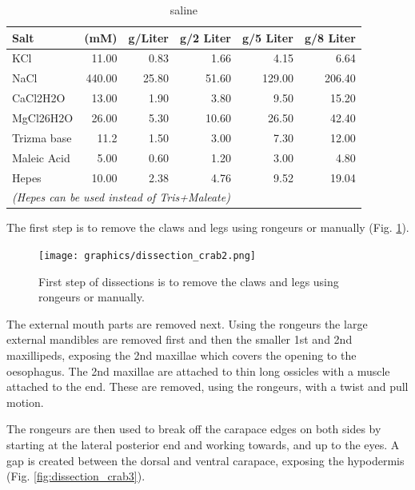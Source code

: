 \begin{table}[H]
	\centering
	\caption{ saline}
	\label{tab:saline}
	\begin{tabular}{lrrrrr}
		\hline 
		\textbf{Salt} & \textbf{(mM)} & \textbf{g/Liter} & \textbf{g/2 Liter} & \textbf{g/5 Liter} & \textbf{g/8 Liter} \\ \hline
		KCl   & 11.00    & 0.83  & 1.66  & 4.15  & 6.64 \\
		NaCl  & 440.00   & 25.80  & 51.60  & 129.00   & 206.40 \\
		CaCl2H2O & 13.00    & 1.90   & 3.80   & 9.50   & 15.20 \\
		MgCl26H2O & 26.00    & 5.30   & 10.60  & 26.50  & 42.40 \\
		Trizma base & 11.2  &  1.50  &  3.00  &  7.30  &  12.00 \\
		Maleic Acid &  5.00  &  0.60  &  1.20  &  3.00  &  4.80 \\
		Hepes &  10.00 &  2.38 &  4.76 &  9.52 & 19.04 \\
		\multicolumn{6}{l}{\textit{(Hepes can be used instead of Tris+Maleate)}} \\
		\hline
	\end{tabular}%
\end{table}%

The first step is to remove the claws and legs using rongeurs or manually (Fig. \ref{fig:dissection_crab2}).

\begin{figure}[H]
	\begin{center}
		\texttt{[image: graphics/dissection\_crab2.png]}
		\caption{First step of dissections is to remove the claws and legs using rongeurs or manually.}
		\label{fig:dissection_crab2}
	\end{center}
\end{figure}

The external mouth parts are removed next. Using the rongeurs the large external mandibles are removed first and then the smaller 1st and 2nd maxillipeds, exposing the 2nd maxillae which covers the opening to the oesophagus. The 2nd maxillae are attached to thin long ossicles with a muscle attached to the end. These are removed, using the rongeurs, with a twist and pull motion.

The rongeurs are then used to break off the carapace edges on both sides by starting at the lateral posterior end and working towards, and up to the eyes. A gap is created between the dorsal and ventral carapace, exposing the hypodermis (Fig. \ref{fig:dissection_crab3}).

